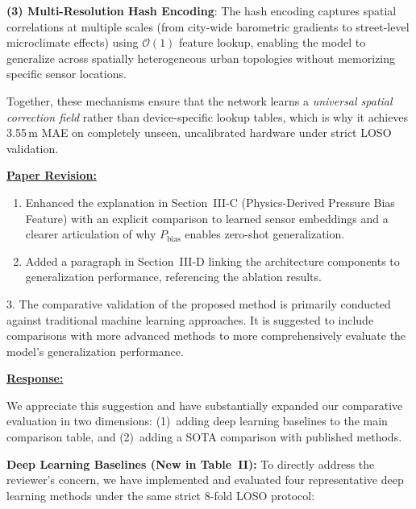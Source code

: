 \textbf{(3) Multi-Resolution Hash Encoding}: The hash encoding captures spatial correlations at multiple scales (from city-wide barometric gradients to street-level microclimate effects) using $\mathcal{O}(1)$ feature lookup, enabling the model to generalize across spatially heterogeneous urban topologies without memorizing specific sensor locations.

Together, these mechanisms ensure that the network learns a \emph{universal spatial correction field} rather than device-specific lookup tables, which is why it achieves 3.55\,m MAE on completely unseen, uncalibrated hardware under strict LOSO validation.

\vspace{0.1cm}
\noindent
\underline{\textbf{Paper Revision:}}

\begin{enumerate}
    \item Enhanced the explanation in Section~III-C (Physics-Derived Pressure Bias Feature) with an explicit comparison to learned sensor embeddings and a clearer articulation of why $P_{\text{bias}}$ enables zero-shot generalization.
    \item Added a paragraph in Section~III-D linking the architecture components to generalization performance, referencing the ablation results.
\end{enumerate}

\newpage

\begin{cmtone}{}{}
3. The comparative validation of the proposed method is primarily conducted against traditional machine learning approaches. It is suggested to include comparisons with more advanced methods to more comprehensively evaluate the model's generalization performance.

\end{cmtone}
\vspace{0.1cm}
\noindent
\underline{\textbf{Response:}}
\vspace{0.2cm}

We appreciate this suggestion and have substantially expanded our comparative evaluation in two dimensions: (1)~adding deep learning baselines to the main comparison table, and (2)~adding a SOTA comparison with published methods.

\textbf{Deep Learning Baselines (New in Table~II):}
To directly address the reviewer's concern, we have implemented and evaluated four representative deep learning methods under the same strict 8-fold LOSO protocol:

